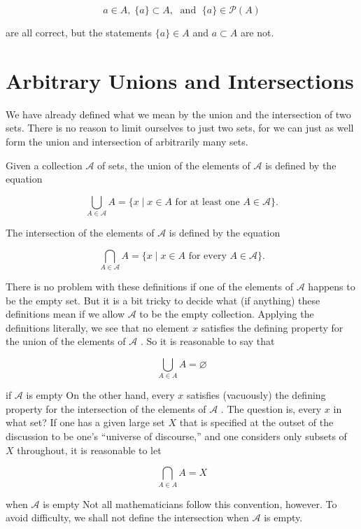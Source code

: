 \[
a \in  A,\;\{ a\}  \subset  A,\;\text{ and }\;\{ a\}  \in  \mathcal{P}\left( A\right)
\]

are all correct, but the statements \(\{ a\}  \in  A\) and \(a \subset  A\) are not.

\section*{Arbitrary Unions and Intersections}

We have already defined what we mean by the union and the intersection of two sets. There is no reason to limit ourselves to just two sets, for we can just as well form the union and intersection of arbitrarily many sets.

Given a collection \(\mathcal{A}\) of sets, the union of the elements of \(\mathcal{A}\) is defined by the equation

\[
\mathop{\bigcup }\limits_{{A \in  \mathcal{A}}}A = \{ x \mid  x \in  A\text{ for at least one }A \in  \mathcal{A}\} .
\]

The intersection of the elements of \(\mathcal{A}\) is defined by the equation

\[
\mathop{\bigcap }\limits_{{A \in  \mathcal{A}}}A = \{ x \mid  x \in  A\text{ for every }A \in  \mathcal{A}\} .
\]

There is no problem with these definitions if one of the elements of \(\mathcal{A}\) happens to be the empty set. But it is a bit tricky to decide what (if anything) these definitions mean if we allow \(\mathcal{A}\) to be the empty collection. Applying the definitions literally, we see that no element \(x\) satisfies the defining property for the union of the elements of \(\mathcal{A}\) . So it is reasonable to say that

\[
\mathop{\bigcup }\limits_{{A \in  A}}A = \varnothing
\]

if \(\mathcal{A}\) is empty On the other hand, every \(x\) satisfies (vacuously) the defining property for the intersection of the elements of \(\mathcal{A}\) . The question is, every \(x\) in what set? If one has a given large set \(X\) that is specified at the outset of the discussion to be one’s ``universe of discourse,'' and one considers only subsets of \(X\) throughout, it is reasonable to let

\[
\mathop{\bigcap }\limits_{{A \in  A}}A = X
\]

when \(\mathcal{A}\) is empty Not all mathematicians follow this convention, however. To avoid difficulty, we shall not define the intersection when \(\mathcal{A}\) is empty.

